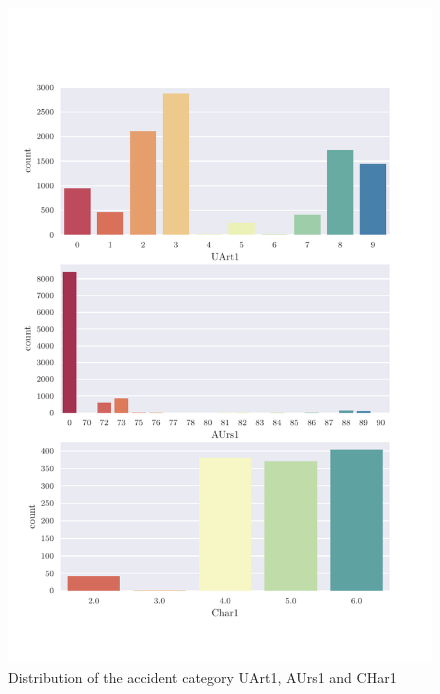 \documentclass[a4paper,headsepline,footsepline,fontsize=11pt,BCOR=12mm,DIV=12]{report}
\begin{document}
\begin{appendices}
\begin{figure}[h]
	\centering
	\includegraphics[scale=0.7]{../CorrAnalysis/data/BAYSIS/01_dataset/plots/baysis_dataset_count_multiple03}
	\caption{Distribution of the accident category UArt1, AUrs1 and CHar1}
	\label{img:appendix_baysis_dataset_03}
\end{figure}


\end{appendices}
\end{document}
